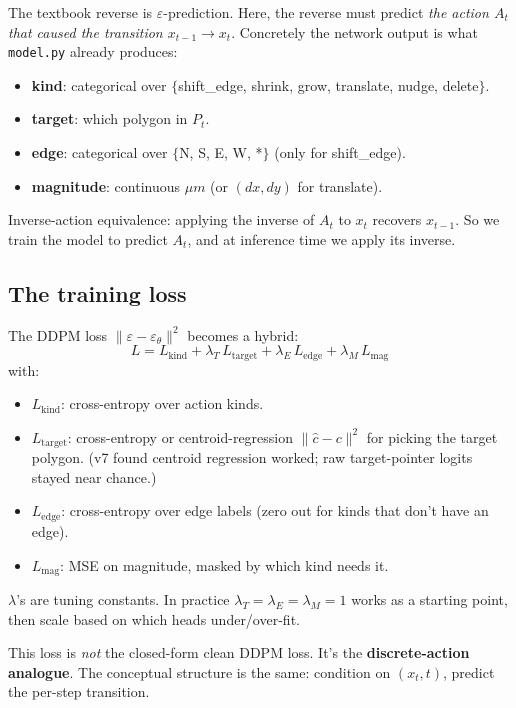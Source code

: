 \documentclass[11pt,a4paper]{article}
\newcommand{\eps}{\varepsilon}
\begin{document}
The textbook reverse is $\eps$-prediction. Here, the reverse must predict
\emph{the action $A_t$ that caused the transition $x_{t-1} \to x_t$}.
Concretely the network output is what \texttt{model.py} already produces:
\begin{itemize}[leftmargin=*]
\item \textbf{kind}: categorical over $\{$shift\_edge, shrink, grow, translate, nudge, delete$\}$.
\item \textbf{target}: which polygon in $P_t$.
\item \textbf{edge}: categorical over $\{$N, S, E, W, *$\}$ (only for shift\_edge).
\item \textbf{magnitude}: continuous $\mu m$ (or $(dx, dy)$ for translate).
\end{itemize}
Inverse-action equivalence: applying the inverse of $A_t$ to $x_t$
recovers $x_{t-1}$. So we train the model to predict $A_t$, and at
inference time we apply its inverse.

\subsection{The training loss}

The DDPM loss $\|\eps - \eps_\theta\|^2$ becomes a hybrid:
\begin{equation}
\boxed{\;
L = L_{\text{kind}} + \lambda_T\, L_{\text{target}} + \lambda_E\, L_{\text{edge}} + \lambda_M\, L_{\text{mag}}\;}
\end{equation}
with:
\begin{itemize}[leftmargin=*]
\item $L_{\text{kind}}$: cross-entropy over action kinds.
\item $L_{\text{target}}$: cross-entropy or centroid-regression
  $\|\hat c - c\|^2$ for picking the target polygon. (v7 found centroid
  regression worked; raw target-pointer logits stayed near chance.)
\item $L_{\text{edge}}$: cross-entropy over edge labels (zero out for
  kinds that don't have an edge).
\item $L_{\text{mag}}$: MSE on magnitude, masked by which kind needs it.
\end{itemize}
$\lambda$'s are tuning constants. In practice $\lambda_T = \lambda_E = \lambda_M = 1$
works as a starting point, then scale based on which heads under/over-fit.

This loss is \emph{not} the closed-form clean DDPM loss. It's the
\textbf{discrete-action analogue}. The conceptual structure is the same:
condition on $(x_t, t)$, predict the per-step transition.
\end{document}
